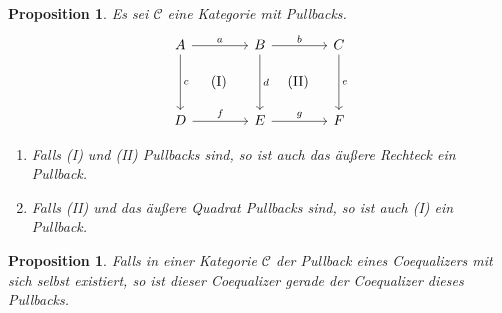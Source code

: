 \documentclass[a4paper, parskip=half]{scrartcl}
\theoremstyle{marginbreak}
\newtheorem{proposition}[remark]{Proposition}
\theoremstyle{nonumberplain}
\newtheorem{proof}{Beweis.}
\newcommand\cat\mathcal
\newcommand{\p}[1]{\iftoggle{proofs}{#1}{}}
\begin{document}
		\begin{proposition}
			Es sei $\cat{C}$ eine Kategorie mit Pullbacks.
			\[
				\begin{tikzcd}[sep=4em]
					A \ar{r}{a} \ar[phantom]{dr}{\text{(I)}} \ar{d}{c} & B \ar[phantom]{dr}{\text{(II)}} \ar{r}{b} \ar{d}{d} & C \ar{d}{e}\\
					D \ar{r}{f} & E \ar{r}{g} & F
				\end{tikzcd}
			\]
			\begin{enumerate}
				\item Falls (I) und (II) Pullbacks sind, so ist auch das äußere
					Rechteck ein Pullback.
				\item Falls (II) und das äußere Quadrat Pullbacks sind, so ist auch
					(I) ein Pullback.
			\end{enumerate}
		\end{proposition}
		\p{\begin{proof}
			\begin{enumerate}
				\item Es seien $x\colon X\to D$, $y\colon X\to C$ mit $g\circ f\circ x = e\circ y$.
					Pullback (II) liefert ein eindeutiges $z\colon X\to B$, sodass
					$b\circ z = y$, $d\circ z = f\circ x$. Letztere Gleichheit und Pullback
					(I) gibt ein eindeutiges $w\colon X\to A$, sodass $a\circ w = z$, $c\circ w = x$.
					Insbesondere gilt $b\circ a\circ w = b\circ z = y$. Es sei $w'\colon X\to A$ ein
					weiterer Morphismus mit $b\circ a\circ w' = y$ und $c\circ w' = x$. Es gilt also
					$b\circ (a\circ w') = y = b\circ (a\circ w)$ und
					$d\circ(a\circ w') = f\circ (c\circ w') = f\circ x = f\circ c\circ w = d\circ (a\circ w)$.
					Pullback (II) liefert $a\circ w'=a\circ w$. Weiter ist $c\circ w'= x = c\circ w$.
					Pullback (I) liefert $w=w'$.
				\item Es sei $(A', c', a')$ der Pullback von $f$ und $d$. Mit (1) und da (II) ein Pullback ist, ist $(A', c', b\circ a')$ ein Pullback von
					$(g\circ f, e)$. Es ist jedoch auch $(A, c, b\circ a)$ ein Pullback von $(g\circ f, e)$.
					Da Limiten eindeutig sind, folgt $A\cong A'$.
			\end{enumerate}
		\end{proof}}
		\begin{proposition}
			Falls in einer Kategorie $\cat{C}$ der Pullback eines Coequalizers mit sich
			selbst existiert, so ist dieser Coequalizer gerade der Coequalizer dieses Pullbacks.
		\end{proposition}
\end{document}
